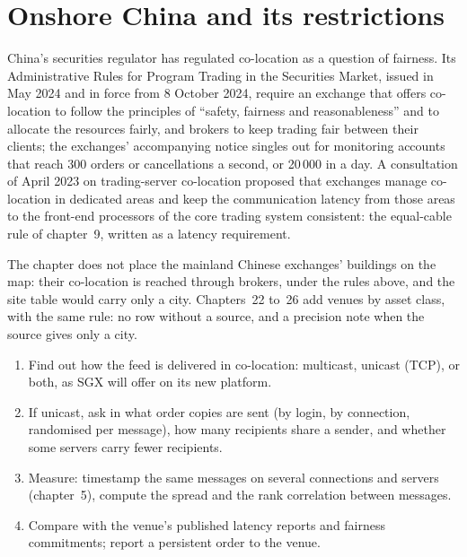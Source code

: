 \section{Onshore China and its restrictions}

China's securities regulator has regulated co-location as a question of fairness. Its Administrative Rules for Program Trading in the
Securities Market, issued in May 2024 and in force from 8 October 2024, require an exchange that offers co-location to follow the principles of
``safety, fairness and reasonableness'' and to allocate the resources fairly, and brokers to keep trading fair between their clients; the
exchanges' accompanying notice singles out for monitoring accounts that reach 300 orders or cancellations a second, or 20\,000 in a day. A
consultation of April 2023 on trading-server co-location proposed that exchanges manage co-location in dedicated areas and keep the
communication latency from those areas to the front-end processors of the core trading system consistent: the equal-cable rule of
chapter~9, written as a latency requirement.

\begin{remark}\label{rem:nw:the-asia-pacific-map:leftout}
The chapter does not place the mainland Chinese exchanges' buildings on the map: their co-location is reached through brokers, under the rules
above, and the site table would carry only a city. Chapters~22 to~26 add venues by asset class, with the same rule: no row without a
source, and a precision note when the source gives only a city.
\end{remark}

\begin{method}\label{met:nw:the-asia-pacific-map:audit}
\begin{enumerate}
\item Find out how the feed is delivered in co-location: multicast, unicast (TCP), or both, as SGX will offer on its new platform.
\item If unicast, ask in what order copies are sent (by login, by connection, randomised per message), how many recipients share a sender,
  and whether some servers carry fewer recipients.
\item Measure: timestamp the same messages on several connections and servers (chapter~5), compute the spread and the rank correlation between
  messages.
\item Compare with the venue's published latency reports and fairness commitments; report a persistent order to the venue.
\end{enumerate}
\end{method}

